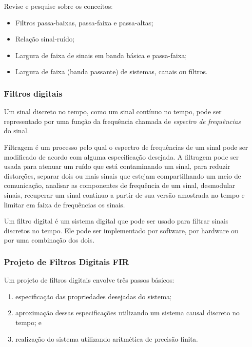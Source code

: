 \documentclass[12pt,addpoints]{exam}
\begin{document}
Revise e pesquise sobre os conceitos:
\begin{itemize}
    \item Filtros passa-baixas, passa-faixa e passa-altas;
    \item Relação sinal-ruído;
    \item Largura de faixa de sinais em banda básica e passa-faixa; 
    \item Largura de faixa (banda passante) de sistemas, canais ou filtros.
\end{itemize}

\subsubsection{Filtros digitais}
\label{sec:filtros}

Um sinal discreto no tempo, como um sinal contínuo no tempo, pode ser representado por uma função da frequência chamada de \textit{espectro de frequências} do sinal.  

Filtragem é um processo pelo qual o espectro de frequências de um sinal pode ser modificado de acordo com alguma especificação desejada. A filtragem pode ser usada para atenuar um ruído que está contaminando um sinal, para reduzir distorções, separar dois ou mais sinais que estejam compartilhando um meio de comunicação, analisar as componentes de frequência de um sinal, desmodular sinais, recuperar um sinal contínuo a partir de sua versão amostrada no tempo e limitar em faixa de frequências os sinais.

Um filtro digital é um sistema digital que pode ser usado para filtrar sinais discretos no tempo. Ele pode ser implementado por software, por hardware ou por uma combinação dos dois.

\subsubsection{Projeto de Filtros Digitais FIR } \label{sec:fir}

Um projeto de filtros digitais envolve três passos básicos:
\begin{enumerate}
    \item especificação das propriedades desejadas do sistema;
    \item aproximação dessas especificações utilizando um sistema causal
    discreto no tempo; e
    \item realização do sistema utilizando aritmética de precisão finita.
\end{enumerate}
\end{document}
